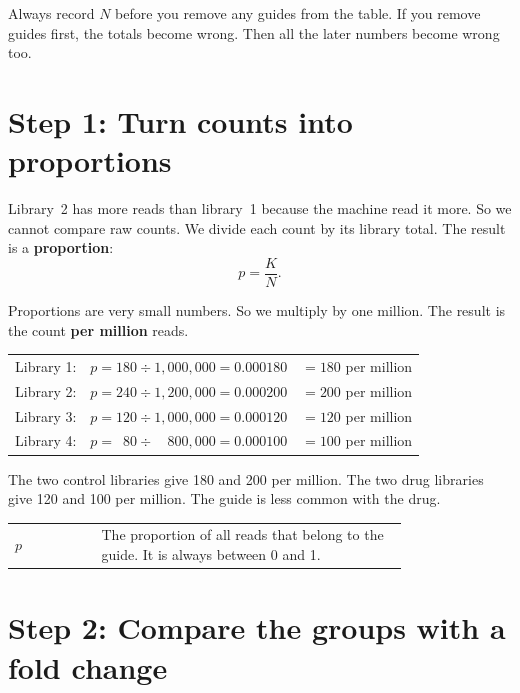 \documentclass[12pt]{article}
\begin{document}
\begin{remember}
Always record $N$ before you remove any guides from the table. If you remove
guides first, the totals become wrong. Then all the later numbers become
wrong too.
\end{remember}

\section{Step 1: Turn counts into proportions}

Library~2 has more reads than library~1 because the machine read it more.
So we cannot compare raw counts. We divide each count by its library total.
The result is a \textbf{proportion}:
\[
p = \frac{K}{N}.
\]

Proportions are very small numbers. So we multiply by one million. The
result is the count \textbf{per million} reads.

\begin{worked}[ 1: proportions]
\begin{tabular}{@{}lll@{}}
Library 1: & $p = 180 \div 1{,}000{,}000 = 0.000180$ & $= 180$ per million\\
Library 2: & $p = 240 \div 1{,}200{,}000 = 0.000200$ & $= 200$ per million\\
Library 3: & $p = 120 \div 1{,}000{,}000 = 0.000120$ & $= 120$ per million\\
Library 4: & $p = \phantom{0}80 \div \phantom{0,}800{,}000 = 0.000100$ & $= 100$ per million\\
\end{tabular}

\smallskip
The two control libraries give 180 and 200 per million. The two drug
libraries give 120 and 100 per million. The guide is less common with the
drug.
\end{worked}

\begin{symbols}
\begin{tabular}{@{}l p{0.78\linewidth}@{}}
$p$ & The proportion of all reads that belong to the guide. It is always
      between 0 and 1.\\
\end{tabular}
\end{symbols}

\section{Step 2: Compare the groups with a fold change}
\end{document}
